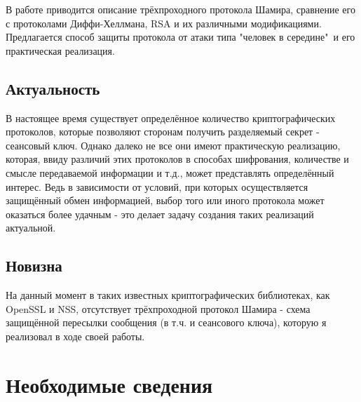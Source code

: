 



\usepackage{csquotes}        %
\usepackage[
]{biblatex}





\Intro

В работе приводится описание трёхпроходного протокола Шамира, сравнение его с протоколами Диффи-Хеллмана, RSA и их различными модификациями. Предлагается способ защиты протокола от атаки типа "человек в середине"\ и его практическая реализация.
\subsection*{Актуальность}
В настоящее время существует определённое количество криптографических протоколов, которые позволяют сторонам получить разделяемый секрет - сеансовый ключ. Однако далеко не все они имеют практическую реализацию, которая, ввиду различий этих протоколов в способах шифрования, количестве и смысле передаваемой информации и т.д., может представлять определённый интерес. Ведь в зависимости от условий, при которых осуществляется защищённый обмен информацией, выбор того или иного протокола может оказаться более удачным - это делает задачу создания таких реализаций актуальной.
\subsection*{Новизна}
На данный момент в таких известных криптографических библиотеках, как OpenSSL и NSS, отсутствует трёхпроходной протокол Шамира - схема защищённой пересылки сообщения (в т.ч. и сеансового ключа), которую я реализовал в ходе своей работы.


\section{Необходимые сведения}


